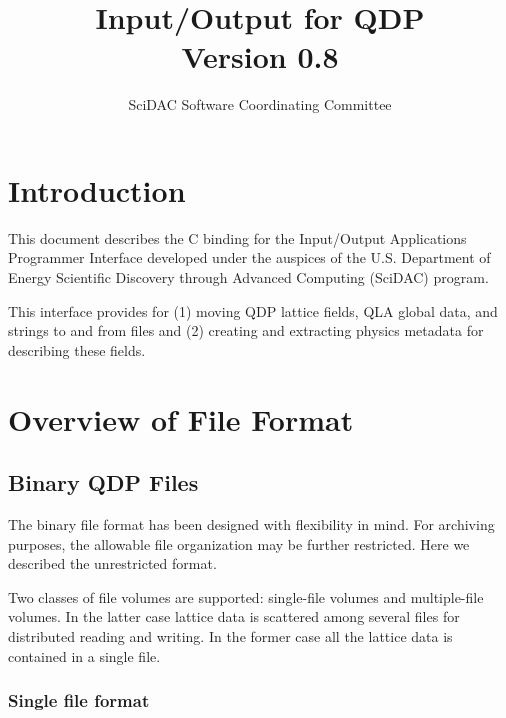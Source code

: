 \documentclass{article}
\begin{document}
\title{
   Input/Output for QDP \\{\large Version 0.8}
}
\author{ SciDAC Software Coordinating Committee}

\maketitle
\section{Introduction}
This document describes the C binding for the Input/Output
Applications Programmer Interface developed under the auspices of the
U.S. Department of Energy Scientific Discovery through Advanced
Computing (SciDAC) program.

This interface provides for (1) moving QDP lattice fields, QLA global
data, and strings to and from files and (2) creating and extracting
physics metadata for describing these fields.

\section{Overview of File Format}
\label{sec.fileformat}

\subsection{Binary QDP Files}

The binary file format has been designed with flexibility in mind. For
archiving purposes, the allowable file organization may be further
restricted.  Here we described the unrestricted format.

Two classes of file volumes are supported: single-file volumes and
multiple-file volumes.  In the latter case lattice data is scattered
among several files for distributed reading and writing.  In the
former case all the lattice data is contained in a single file.

\subsubsection{Single file format}
\end{document}
